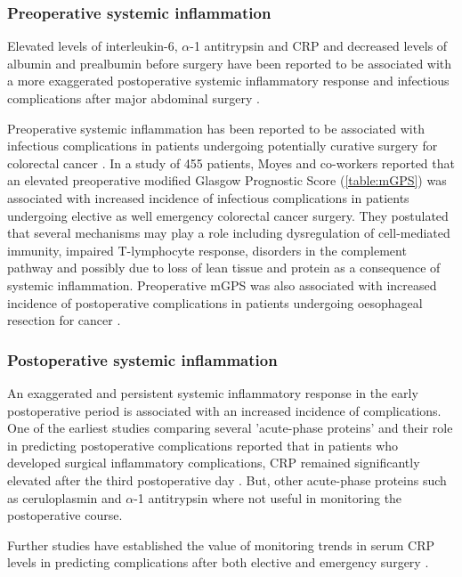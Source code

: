 \subsubsection{Preoperative systemic inflammation}
Elevated levels of interleukin-6, $\alpha$-1 antitrypsin and CRP and decreased levels of albumin and prealbumin before surgery have been reported to be associated with a more exaggerated postoperative systemic inflammatory response and infectious complications after major abdominal surgery \parencite{haupt_association_1997}. 

Preoperative systemic inflammation has been reported to be associated with infectious complications in patients undergoing potentially curative surgery for colorectal cancer \parencite{moyes_preoperative_2009}. 
In a study of 455 patients, Moyes and co-workers reported that an elevated preoperative modified Glasgow Prognostic Score (\ref{table:mGPS}) was associated with increased incidence of infectious complications in patients undergoing elective as well emergency colorectal cancer surgery. 
They postulated that several mechanisms may play a role including dysregulation of cell-mediated immunity, impaired T-lymphocyte response, disorders in the complement pathway and possibly due to loss of lean tissue and protein as a consequence of systemic inflammation. 
Preoperative mGPS was also associated with increased incidence of postoperative complications in patients undergoing oesophageal resection for cancer \parencite{vashist_glasgow_2010}. 

\subsubsection{Postoperative systemic inflammation}
An exaggerated and persistent systemic inflammatory response in the early postoperative period is associated with an increased incidence of complications. 
One of the earliest studies comparing several 'acute-phase proteins' and their role in predicting postoperative complications reported that in patients who developed surgical inflammatory complications, CRP remained significantly elevated after the third postoperative day \parencite{fischer_quantitation_1976}.
But,  other acute-phase proteins such as ceruloplasmin and  $\alpha$-1 antitrypsin where not useful in monitoring the postoperative course. 

Further studies have established the value of monitoring trends in serum CRP levels in predicting complications after both elective and emergency surgery \parencite{mustard_c-reactive_1987}. 

